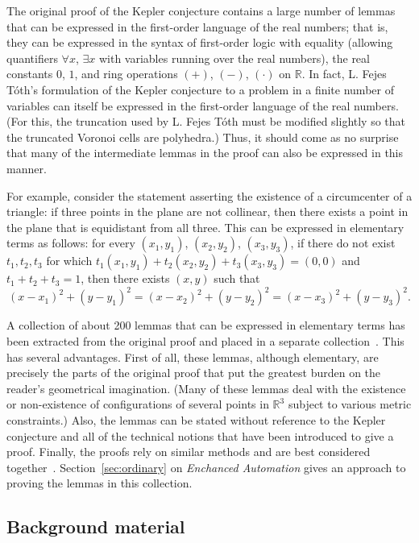 \documentclass[11pt]{amsart}
\newcommand{\ring}[1]{\mathbb{#1}}
\begin{document}
The original proof of the Kepler conjecture contains a large number of lemmas that can be
expressed in the first-order language of the real numbers; that is, they can be expressed in
the syntax of first-order logic with equality (allowing quantifiers $\forall x$, $\exists x$ with variables
running over the real numbers), the real constants $0$, $1$, and ring operations $(+)$, $(-)$,
$(\cdot)$ on $\ring{R}$.  In fact, L. Fejes T\'oth's formulation of the Kepler conjecture to
a problem in a finite number of variables can itself be expressed in the
first-order language of the real numbers.  (For this, the truncation used by L. Fejes T\'oth must be modified slightly so that the truncated Voronoi cells are polyhedra.)  Thus, it should come as no surprise that many
of the intermediate lemmas in the proof can also be expressed in this manner.

For example, consider the statement asserting the existence of a circumcenter of a triangle: 
if three points in the plane are not collinear, then there exists a
point in the plane that is equidistant from all three.  This can be expressed in elementary terms
as follows:  for every $(x_1,y_1)$, $(x_2,y_2)$, $(x_3,y_3)$, if there do not exist $t_1,t_2,t_3$
for which $t_1 (x_1,y_1) + t_2 (x_2,y_2)+ t_3 (x_3,y_3) = (0,0)$ and $t_1+t_2+t_3=1$, then there exists
$(x,y)$ such that 
$$
  (x-x_1)^2 + (y-y_1)^2 = (x-x_2)^2 + (y-y_2)^2 = (x-x_3)^2 + (y-y_3)^2. 
$$



A collection of about 200 lemmas that can be expressed in elementary terms has been extracted from 
the original proof and placed in a separate collection~\cite{hales:2008:collection}.  This has
several advantages.  First of all, these lemmas, although elementary, are precisely the parts of the
original proof that put the greatest burden on the reader's geometrical imagination.  (Many of these
lemmas deal with the existence or non-existence of configurations of several points in $\ring{R}^3$ subject to
various metric constraints.)  Also, the lemmas can be stated without reference to the Kepler conjecture and all of the
technical notions that have been introduced to give a proof.
Finally, the proofs rely on similar methods and are best considered
together~\cite{1271687}.  Section~\ref{sec:ordinary} on {\it Enchanced Automation} gives an approach to proving the lemmas in this collection.

 

\subsection*{Background material}
\end{document}
